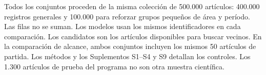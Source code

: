 \begin{table}[!htbp]
\begin{minipage}{\linewidth}
\begin{tabular}{@{}>{\raggedright\arraybackslash}p{4.0cm}>{\raggedright\arraybackslash}p{5.4cm}>{\raggedright\arraybackslash}p{5.75cm}@{}}
\bottomrule
\end{tabular}
\par\smallskip
Todos los conjuntos proceden de la misma colección de 500.000 artículos: 400.000 registros generales y 100.000 para reforzar grupos pequeños de área y período. Las filas no se suman. Los modelos usan los mismos identificadores en cada comparación. Los candidatos son los artículos disponibles para buscar vecinos. En la comparación de alcance, ambos conjuntos incluyen los mismos 50 artículos de partida. Los métodos y los Suplementos S1--S4 y S9 detallan los controles. Los 1.300 artículos de prueba del programa no son otra muestra científica.
\end{minipage}\par
\end{table}
